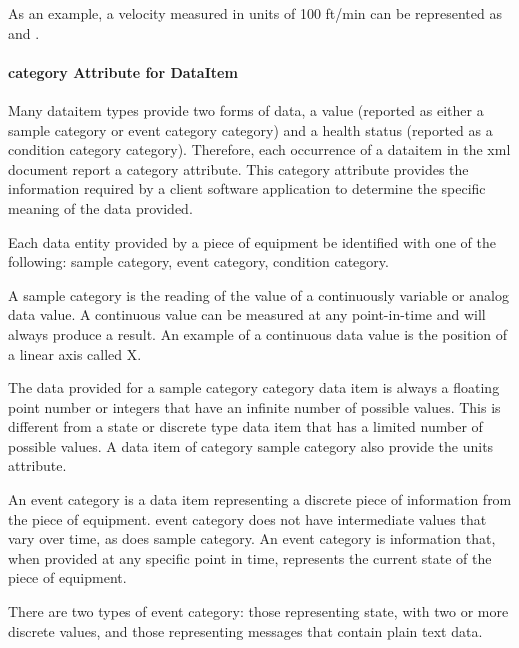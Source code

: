 As an example, a velocity measured in units of 100 ft/min can be represented as  and . 

\paragraph{category Attribute for DataItem}
\label{sec:category Attribute for DataItem}\mbox{}

Many \gls{dataitem} types provide two forms of data, a value (reported as either a \gls{sample category} or \gls{event category} category) and a health status (reported as a \gls{condition category} category).  Therefore, each occurrence of a \gls{dataitem} in the \gls{xml} document \must report a \gls{category} attribute.  This \gls{category} attribute provides the information required by a client software application to determine the specific meaning of the data provided.

\newpage

Each \gls{data entity} provided by a piece of equipment \must be identified with one of the following: \gls{sample category}, \gls{event category}, \gls{condition category}.

A \gls{sample category} is the reading of the value of a continuously variable or analog data value.  A continuous value can be measured at any point-in-time and will always produce a result.  An example of a continuous data value is the position of a linear axis called X.   

The data provided for a \gls{sample category} category data item is always a floating point number or integers that have an infinite number of possible values.  This is different from a state or discrete type data item that has a limited number of possible values.  A data item of category \gls{sample category} \must also provide the \gls{units} attribute.



An \gls{event category} is a data item representing a discrete piece of information from the piece of equipment.  \gls{event category} does not have intermediate values that vary over time, as does \gls{sample category}.   An \gls{event category} is information that, when provided at any specific point in time, represents the current state of the piece of equipment.

There are two types of \gls{event category}: those representing state, with two or more discrete values, and those representing messages that contain plain text data.

